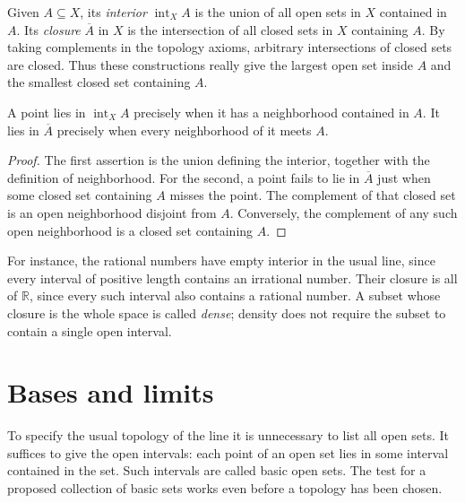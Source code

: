 Given $A\subseteq X$, its \emph{interior} $\operatorname{int}_X A$ is the union of all open sets in $X$ contained in $A$. Its \emph{closure} $\overline A$ in $X$ is the intersection of all closed sets in $X$ containing $A$. By taking complements in the topology axioms, arbitrary intersections of closed sets are closed. Thus these constructions really give the largest open set inside $A$ and the smallest closed set containing $A$.

\begin{proposition}\label{f:top-closure}
A point lies in $\operatorname{int}_X A$ precisely when it has a neighborhood contained in $A$. It lies in $\overline A$ precisely when every neighborhood of it meets $A$.
\end{proposition}
\begin{proof}
The first assertion is the union defining the interior, together with the definition of neighborhood. For the second, a point fails to lie in $\overline A$ just when some closed set containing $A$ misses the point. The complement of that closed set is an open neighborhood disjoint from $A$. Conversely, the complement of any such open neighborhood is a closed set containing $A$.
\end{proof}

For instance, the rational numbers have empty interior in the usual line, since every interval of positive length contains an irrational number. Their closure is all of $\mathbb R$, since every such interval also contains a rational number. A subset whose closure is the whole space is called \emph{dense}; density does not require the subset to contain a single open interval.

\section{Bases and limits}

To specify the usual topology of the line it is unnecessary to list all open sets. It suffices to give the open intervals: each point of an open set lies in some interval contained in the set. Such intervals are called basic open sets. The test for a proposed collection of basic sets works even before a topology has been chosen.

